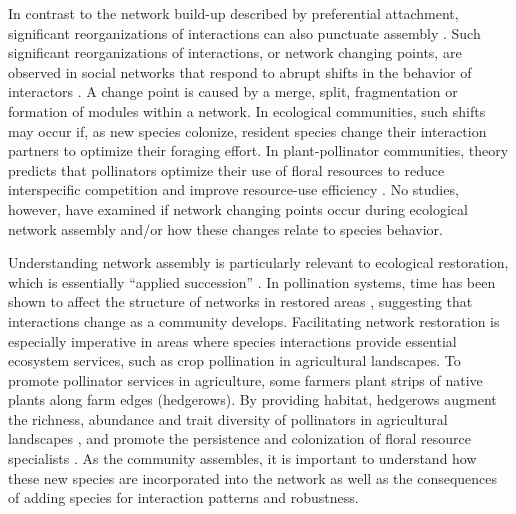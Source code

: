 \documentclass[12pt]{article}
\begin{document}
In contrast to the network build-up described by preferential
attachment, significant reorganizations of interactions can also
punctuate assembly \citep{peel2014detecting}. Such significant
reorganizations of interactions, or network changing points, are
observed in social networks that respond to abrupt shifts in the
behavior of interactors \citep{peel2014detecting}. A change point is
caused by a merge, split, fragmentation or formation of modules within
a network. In ecological communities, such shifts may occur if, as new
species colonize, resident species change their interaction partners
to optimize their foraging effort. In plant-pollinator communities,
theory predicts that pollinators optimize their use of floral
resources to reduce interspecific competition and improve resource-use
efficiency \citep{pyke1984optimal, valdovinos2010consequences,
  valdovinos2013adaptive, albrecht2010plant, Bluthgen2007}. No
studies, however, have examined if network changing points occur
during ecological network assembly and/or how these changes relate to
species behavior.

Understanding network assembly is particularly relevant to ecological
restoration, which is essentially ``applied succession''
\citep[e.g.,][]{parker1997scale}.  In pollination systems, time has
been shown to affect the structure of networks in restored areas
\citep{forup-2008-742, devoto2012understanding}, suggesting that
interactions change as a community develops. Facilitating network
restoration is especially imperative in areas where species
interactions provide essential ecosystem services, such as crop
pollination in agricultural landscapes. To promote pollinator services
in agriculture, some farmers plant strips of native plants along farm
edges (hedgerows).  By providing habitat, hedgerows augment the
richness, abundance and trait diversity of pollinators in agricultural
landscapes \citep{morandin-2013-829, kremen-2015-602,
  ponisio2015farm}, and promote the persistence and colonization of
floral resource specialists \citep{mgonigle-2015-x}. As the community
assembles, it is important to understand how these new species are
incorporated into the network as well as the consequences of adding
species for interaction patterns and robustness.
\end{document}
